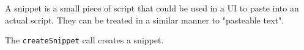 A snippet is a small piece of script that could be used in a UI to paste into an actual
\Reflex script. They can be treated in a similar manner to "pasteable text".

The \verb+createSnippet+ call creates a snippet.
